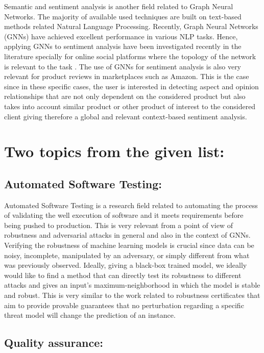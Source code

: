 \documentclass[a4paper,11pt]{article}
\begin{document}
\noindent Semantic and sentiment analysis is another field related to Graph Neural Networks. The majority of available used techniques are built on text-based methods related Natural Language Processing. Recently, Graph Neural Networks (GNNs) have achieved excellent performance in various NLP tasks. Hence, applying GNNs to sentiment analysis have been investigated recently in the literature specially for online social platforms where the topology of the network is relevant to the task \cite{9720918, LIAO2021107096}. The use of GNNs for sentiment analysis is also very relevant for product reviews in marketplaces such as Amazon. This is the case since in these specific cases, the user is interested in detecting aspect and opinion relationships that are not only dependent on the considered product but also takes into account similar product or other product of interest to the considered client giving therefore a global and relevant context-based sentiment analysis.

\section{Two topics from the given list:}

\subsection{Automated Software Testing:}

Automated Software Testing is a research field related to automating the process of validating the well execution of software and it meets requirements before being pushed to production. This is very relevant from a point of view of robustness and adversarial attacks in general and also in the context of GNNs. Verifying the robustness of machine learning models is crucial since data can be noisy, incomplete, manipulated by an adversary, or simply different from what was previously observed. Ideally, giving a black-box trained model, we ideally would like to find a method that can directly test its robustness to different attacks and gives an input's maximum-neighborhood in which the model is stable and robust. This is very similar to the work related to robustness certificates that aim to provide provable guarantees that no perturbation regarding a specific threat model will change the prediction of an instance. 

\subsection{Quality assurance:}
\end{document}
